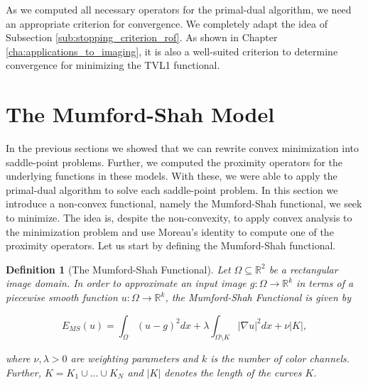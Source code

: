 \documentclass[abstracton]{scrreprt}
\newtheorem{definition}[theorem]{Definition}
\begin{document}
            As we computed all necessary operators for the primal-dual algorithm, we need an appropriate criterion for convergence. We completely adapt the idea of Subsection \ref{sub:stopping_criterion_rof}. As shown in Chapter \ref{cha:applications_to_imaging}, it is also a well-suited criterion to determine convergence for minimizing the TVL1 functional.

    \section{The Mumford-Shah Model} %
    \label{sec:the_mumford_shah_model}
        
        In the previous sections we showed that we can rewrite convex minimization into saddle-point problems. Further, we computed the proximity operators for the underlying functions in these models. With these, we were able to apply the primal-dual algorithm to solve each saddle-point problem. In this section we introduce a non-convex functional, namely the Mumford-Shah functional, we seek to minimize. The idea is, despite the non-convexity, to apply convex analysis to the minimization problem and use Moreau's identity to compute one of the proximity operators. Let us start by defining the Mumford-Shah functional.
        \begin{definition}[The Mumford-Shah Functional] %
        \label{def:the_mumford_shah_functional}
            Let $\Omega \subseteq \mathbb{R}^{2}$ be a rectangular image domain. In order to approximate an input image $g: \Omega \longrightarrow \mathbb{R}^{k}$ in terms of a piecewise smooth function $u: \Omega \longrightarrow \mathbb{R}^{k}$, the Mumford-Shah Functional is given by
                    
                    \begin{equation}
                        E_{MS}(u) = \int_{\Omega} (u - g)^{2} dx + \lambda \int_{\Omega \setminus K} |\nabla u|^{2} dx + \nu |K|,
                    \end{equation}
                    \label{eq:the_mumford_shah_functional}
                
                where $\nu, \lambda > 0$ are weighting parameters and $k$ is the number of color channels. Further, $K = K_{1} \cup ... \cup K_{N}$ and $|K|$ denotes the length of the curves $K$.
        \end{definition}
\end{document}
